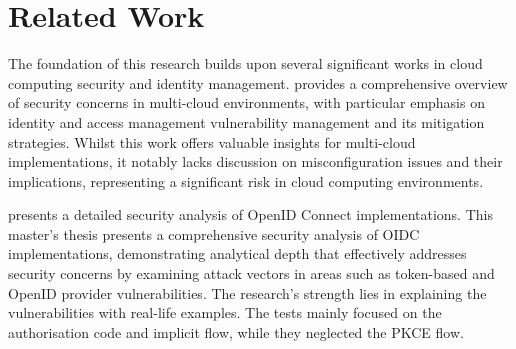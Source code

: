 \section{Related Work}

The foundation of this research builds upon several significant works in cloud computing security and identity management. \cite{cloud_shared_resp} provides a comprehensive overview of security concerns in multi-cloud environments, with particular emphasis on identity and access management vulnerability management and its mitigation strategies. Whilst this work offers valuable insights for multi-cloud implementations, it notably lacks discussion on misconfiguration issues and their implications, representing a significant risk in cloud computing environments.

\cite{oidc_attacks} presents a detailed security analysis of OpenID Connect implementations. This master's thesis presents a comprehensive security analysis of OIDC implementations, demonstrating analytical depth that effectively addresses security concerns by examining attack vectors in areas such as token-based and OpenID provider vulnerabilities. The research's strength lies in explaining the vulnerabilities with real-life examples. The tests mainly focused on the authorisation code and implicit flow, while they neglected the PKCE flow.

